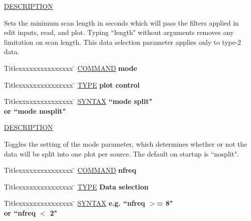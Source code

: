 \underline{DESCRIPTION}
\begin{list}{}{\setlength{\leftmargin}{0.5in}
     \setlength{\rightmargin}{0in}}
\item
Sets the minimum scan length in seconds
which will pass the filters applied in edit inputs, 
read, and plot.  Typing ``length" without arguments 
removes any limitation on scan length.  This data
selection parameter applies only to type-2 data.
\end{list}
\vspace{.2in}

\begin{tabbing}
Titlexxxxxxxxxxxxxxx \= \kill
\underline{COMMAND} \> {\bf 	mode} \\
\end{tabbing}

\begin{tabbing}
Titlexxxxxxxxxxxxxxx \= \kill
\underline{TYPE} \> {\bf 		plot control} \\
\end{tabbing}

\begin{tabbing}
Titlexxxxxxxxxxxxxxx \= \kill
\underline{SYNTAX} \> {\bf 		``mode split"} \\
\> {\bf 	    or  ``mode nosplit"} \\
\end{tabbing}

\underline{DESCRIPTION}
\begin{list}{}{\setlength{\leftmargin}{0.5in}
     \setlength{\rightmargin}{0in}}
\item
Toggles the setting of the mode parameter, which determines
whether or not the data will be split into one plot per
source.  The default on startup is ``nosplit".
\end{list}
\vspace{.2in}

\begin{tabbing}
Titlexxxxxxxxxxxxxxx \= \kill
\underline{COMMAND} \> {\bf 	nfreq} \\
\end{tabbing}

\begin{tabbing}
Titlexxxxxxxxxxxxxxx \= \kill
\underline{TYPE} \> {\bf 		Data selection} \\
\end{tabbing}

\begin{tabbing}
Titlexxxxxxxxxxxxxxx \= \kill
\underline{SYNTAX} \> {\bf 	  e.g.	``nfreq $>$= 8"} \\
\> {\bf 	    or	``nfreq $<$ 2"} \\
\end{tabbing}

